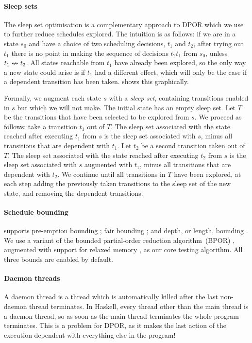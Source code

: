 \paragraph{Sleep sets}
The sleep set optimisation \parencite{godefroid1996} is a complementary
approach to DPOR which we use to further reduce schedules explored.
The intuition is as follows: if we are in a state $s_{0}$ and have a
choice of two scheduling decisions, $t_{1}$ and $t_{2}$, after trying
out $t_{1}$ there is no point in making the sequence of decisions
$t_{2}t_{1}$ from $s_{0}$, unless $t_{1} \nleftrightarrow t_{2}$.  All
states reachable from $t_{1}$ have already been explored, so the only
way a new state could arise is if $t_{1}$ had a different effect,
which will only be the case if a dependent transition has been taken.
 shows this graphically.

Formally, we augment each state $s$ with a \emph{sleep set},
containing transitions enabled in $s$ but which we will not make.  The
initial state has an empty sleep set.  Let $T$ be the transitions that
have been selected to be explored from $s$.  We proceed as follows:
take a transition $t_{1}$ out of $T$.  The sleep set associated with
the state reached after executing $t_{1}$ from $s$ is the sleep set
associated with $s$, minus all transitions that are dependent with
$t_{1}$.  Let $t_{2}$ be a second transition taken out of $T$.  The
sleep set associated with the state reached after executing $t_{2}$
from $s$ is the sleep set associated with $s$ augmented with $t_{1}$,
minus all transitions that are dependent with $t_{2}$.  We continue
until all transitions in $T$ have been explored, at each step adding
the previously taken transitions to the sleep set of the new state,
and removing the dependent transitions.

\paragraph{Schedule bounding}
\dejafu{} supports pre-emption bounding \parencite{musuvathi2007};
fair bounding \parencite{musuvathi2008}; and depth, or length,
bounding \parencite{russell2002}.  We use a variant of the bounded
partial-order reduction algorithm~(BPOR) \parencite{coons2013},
augmented with support for relaxed memory \parencite{zhang2015}, as
our core testing algorithm.  All three bounds are enabled by default.

\paragraph{Daemon threads}
A daemon thread is a thread which is automatically killed after the
last non-daemon thread terminates.  In Haskell, every thread other
than the main thread is a daemon thread, so as soon as the main thread
terminates the whole program terminates.  This is a problem for DPOR,
as it makes the last action of the execution dependent with everything
else in the program!

